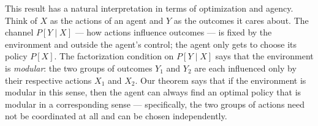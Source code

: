 \documentclass[11pt]{article}
\begin{document}
\begin{exercise}
\begin{remark}
This result has a natural interpretation in terms of optimization and agency. Think of $X$ as the actions of an agent and $Y$ as the outcomes it cares about. The channel $P[Y \mid X]$ — how actions influence outcomes — is fixed by the environment and outside the agent's control; the agent only gets to choose its policy $P[X]$. The factorization condition on $P[Y \mid X]$ says that the environment is \emph{modular}: the two groups of outcomes $Y_1$ and $Y_2$ are each influenced only by their respective actions $X_1$ and $X_2$. Our theorem says that if the environment is modular in this sense, then the agent can always find an optimal policy that is modular in a corresponding sense --- specifically, the two groups of actions need not be coordinated at all and can be chosen independently.
\end{remark}
\end{exercise}
\end{document}
